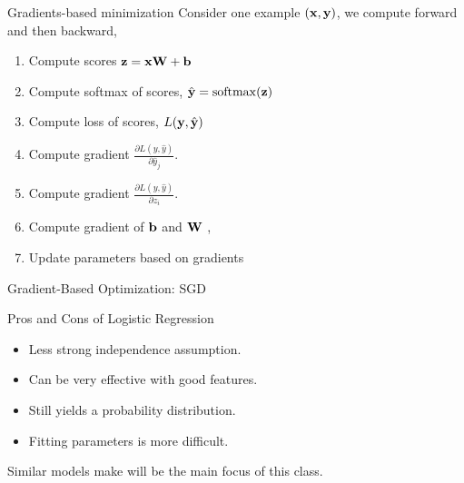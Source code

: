 \documentclass{beamer}
\begin{document}
\begin{frame}{Gradients-based minimization}
  Consider one example $(\mathbf{x}, \mathbf{y})$, we compute forward and then backward,

  \begin{enumerate}
  \item Compute scores $\mathbf{z} =  \mathbf{x} \mathbf{W} + \mathbf{b}$  
  \item Compute softmax of scores, $\hat{\boldy} = \softmax(\boldz)$  
  \item Compute loss of scores, $L(\mathbf{y}, \hat{\mathbf{y}})$  

  \pause
  \item Compute gradient $\frac{\partial L(y, \hat{y})}{\partial \hat{y}_j}$.

  \item Compute gradient $\frac{\partial L(y, \hat{y})}{\partial z_i}$.

  \item Compute gradient of $\mathbf{b}$ and $\mathbf{W}$ , 

    \pause
  \item Update parameters based on gradients

  \end{enumerate}
\end{frame}

\begin{frame}{Gradient-Based Optimization: SGD}
  \begin{figure}
    \begin{algorithmic}
      \EndWhile{}
      \State{\Return{$\theta$}}
      \EndProcedure{}
    \end{algorithmic}
  \end{figure}
\end{frame}




\begin{frame}{Pros and Cons of Logistic Regression}
  \begin{itemize}
  \item Less strong independence assumption.
  \item Can be very effective with good features.
  \item Still yields a probability distribution.
  \item Fitting parameters is more difficult.
  \end{itemize}
  
  Similar models make will be the main focus of this class.
\end{frame}
\end{document}
